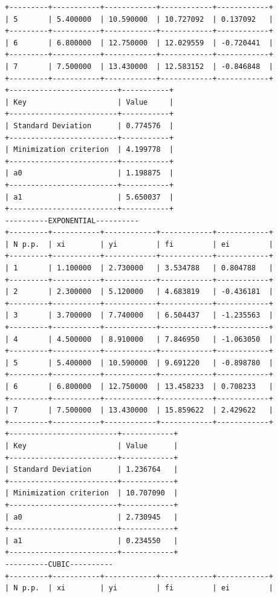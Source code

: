 \documentclass[12pt,one column]{article}
\begin{document}
\begin{verbatim}
+---------+-----------+------------+------------+------------+
| 5       | 5.400000  | 10.590000  | 10.727092  | 0.137092   | 
+---------+-----------+------------+------------+------------+
| 6       | 6.800000  | 12.750000  | 12.029559  | -0.720441  | 
+---------+-----------+------------+------------+------------+
| 7       | 7.500000  | 13.430000  | 12.583152  | -0.846848  | 
+---------+-----------+------------+------------+------------+
+-------------------------+-----------+
| Key                     | Value     | 
+-------------------------+-----------+
| Standard Deviation      | 0.774576  | 
+-------------------------+-----------+
| Minimization criterion  | 4.199778  | 
+-------------------------+-----------+
| a0                      | 1.198875  | 
+-------------------------+-----------+
| a1                      | 5.650037  | 
+-------------------------+-----------+
----------EXPONENTIAL----------
+---------+-----------+------------+------------+------------+
| N p.p.  | xi        | yi         | fi         | ei         | 
+---------+-----------+------------+------------+------------+
| 1       | 1.100000  | 2.730000   | 3.534788   | 0.804788   | 
+---------+-----------+------------+------------+------------+
| 2       | 2.300000  | 5.120000   | 4.683819   | -0.436181  | 
+---------+-----------+------------+------------+------------+
| 3       | 3.700000  | 7.740000   | 6.504437   | -1.235563  | 
+---------+-----------+------------+------------+------------+
| 4       | 4.500000  | 8.910000   | 7.846950   | -1.063050  | 
+---------+-----------+------------+------------+------------+
| 5       | 5.400000  | 10.590000  | 9.691220   | -0.898780  | 
+---------+-----------+------------+------------+------------+
| 6       | 6.800000  | 12.750000  | 13.458233  | 0.708233   | 
+---------+-----------+------------+------------+------------+
| 7       | 7.500000  | 13.430000  | 15.859622  | 2.429622   | 
+---------+-----------+------------+------------+------------+
+-------------------------+------------+
| Key                     | Value      | 
+-------------------------+------------+
| Standard Deviation      | 1.236764   | 
+-------------------------+------------+
| Minimization criterion  | 10.707090  | 
+-------------------------+------------+
| a0                      | 2.730945   | 
+-------------------------+------------+
| a1                      | 0.234550   | 
+-------------------------+------------+
----------CUBIC----------
+---------+-----------+------------+------------+------------+
| N p.p.  | xi        | yi         | fi         | ei         | 

\end{verbatim}
\end{document}
